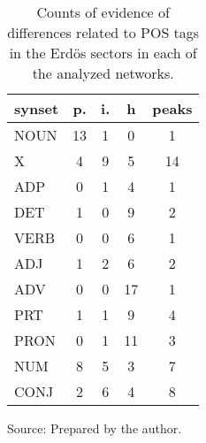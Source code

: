 \begin{table}[h!]
\begin{center}
\caption{Counts of evidence of differences related to POS tags in the Erd\"os sectors in each of the analyzed networks.}
\begin{tabular}{| l || c | c | c || c |}\hline
{\bf synset} & {\bf p.} & {\bf i.} & {\bf h} & {\bf peaks} \\\hline\hline
NOUN & 13  & 1  & 0  & 1 \\
X & 4  & 9  & 5  & 14 \\\hline
ADP & 0  & 1  & 4  & 1 \\
DET & 1  & 0  & 9  & 2 \\\hline
VERB & 0  & 0  & 6  & 1 \\\hline
ADJ & 1  & 2  & 6  & 2 \\
ADV & 0  & 0  & 17  & 1 \\\hline
PRT & 1  & 1  & 9  & 4 \\
PRON & 0  & 1  & 11  & 3 \\
NUM & 8  & 5  & 3  & 7 \\
CONJ & 2  & 6  & 4  & 8 \\\hline
\end{tabular}
\begin{flushleft}
		Source: Prepared by the author.\
\end{flushleft}
\end{center}
\end{table}
